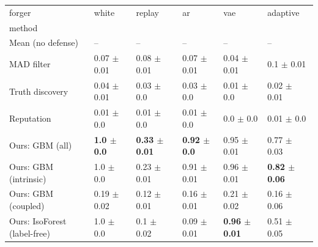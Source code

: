 \begin{tabular}{llllll}
\toprule
forger & white & replay & ar & vae & adaptive \\
method &  &  &  &  &  \\
\midrule
Mean (no defense) & -- & -- & -- & -- & -- \\
MAD filter & 0.07 $\pm$ 0.01 & 0.08 $\pm$ 0.01 & 0.07 $\pm$ 0.01 & 0.04 $\pm$ 0.01 & 0.1 $\pm$ 0.01 \\
Truth discovery & 0.04 $\pm$ 0.01 & 0.03 $\pm$ 0.0 & 0.03 $\pm$ 0.0 & 0.01 $\pm$ 0.0 & 0.02 $\pm$ 0.01 \\
Reputation & 0.01 $\pm$ 0.0 & 0.01 $\pm$ 0.0 & 0.01 $\pm$ 0.0 & 0.0 $\pm$ 0.0 & 0.01 $\pm$ 0.0 \\
Ours: GBM (all) & \textbf{1.0 $\pm$ 0.0} & \textbf{0.33 $\pm$ 0.01} & \textbf{0.92 $\pm$ 0.0} & 0.95 $\pm$ 0.01 & 0.77 $\pm$ 0.03 \\
Ours: GBM (intrinsic) & 1.0 $\pm$ 0.0 & 0.23 $\pm$ 0.01 & 0.91 $\pm$ 0.01 & 0.96 $\pm$ 0.01 & \textbf{0.82 $\pm$ 0.06} \\
Ours: GBM (coupled) & 0.19 $\pm$ 0.02 & 0.12 $\pm$ 0.01 & 0.16 $\pm$ 0.01 & 0.21 $\pm$ 0.02 & 0.16 $\pm$ 0.06 \\
Ours: IsoForest (label-free) & 1.0 $\pm$ 0.0 & 0.1 $\pm$ 0.02 & 0.09 $\pm$ 0.01 & \textbf{0.96 $\pm$ 0.01} & 0.51 $\pm$ 0.05 \\
\bottomrule
\end{tabular}
